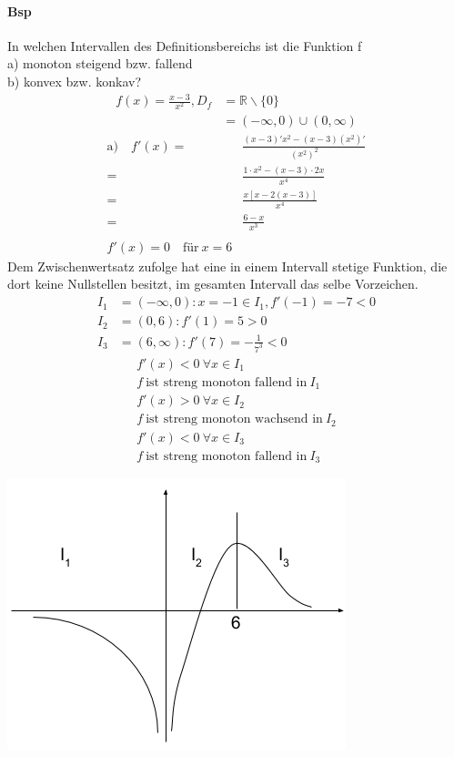 \documentclass{article}
\begin{document}
\paragraph{Bsp} 
In welchen Intervallen des Definitionsbereichs ist die Funktion f
\\
a) \quad monoton steigend bzw. fallend \\
b) \quad konvex bzw. konkav?
\begin{align*}
	f(x)=\frac{x-3}{x^2}, D_f&=\mathbb{R} \backslash\{0\}
	\\
	&=(-\infty, 0)\cup(0,\infty)
\end{align*}
\begin{align*}
	\text{a)} \quad f'(x)=&\frac{(x-3)'x^2-(x-3)(x^2)'}{(x^2)^2}
	\\
	=&\frac{1 \cdot{x^2}-(x-3) \cdot{2x}}{x^4}
	\\
	=&\frac{x[x-2(x-3)]}{x^4}
	\\
	=&\frac{6-x}{x^3}
	\\
	\\
	f'(x) = 0 \quad \text{f\"ur} \ x = 6  
\end{align*}
Dem Zwischenwertsatz zufolge hat eine in einem Intervall stetige Funktion,
die dort keine Nullstellen besitzt, im gesamten Intervall das selbe Vorzeichen.
\begin{align*}
	I_1&=(-\infty,0):x=-1 \in I_1,f'(-1)=-7 < 0
	\\
	I_2&=(0,6):f'(1)=5 > 0
	\\
	I_3&=(6,\infty):f'(7)=-\frac{1}{7^3} < 0	
\end{align*}
\begin{align*}
	f'(x) < 0 \ \forall x \in I_1
	\\
	f \ \text{ist streng monoton fallend in} \ I_1
	\\	
	f'(x) > 0 \ \forall x \in I_2
	\\
	f \ \text{ist streng monoton wachsend in} \ I_2
	\\	
	f'(x) < 0 \ \forall x \in I_3
	\\
	f \ \text{ist streng monoton fallend in} \ I_3
\end{align*}
\begin{center}
	\includegraphics[scale=0.5]{png/intervall_nullstellen.png}
\end{center}
\end{document}
